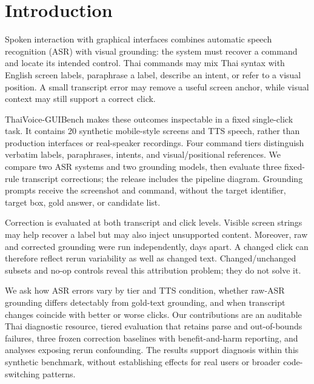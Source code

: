 \section{Introduction}

Spoken interaction with graphical interfaces combines automatic speech recognition (ASR) with visual grounding: the system must recover a command and locate its intended control. Thai commands may mix Thai syntax with English screen labels, paraphrase a label, describe an intent, or refer to a visual position. A small transcript error may remove a useful screen anchor, while visual context may still support a correct click.

ThaiVoice-GUIBench makes these outcomes inspectable in a fixed single-click task. It contains 20 synthetic mobile-style screens and TTS speech, rather than production interfaces or real-speaker recordings. Four command tiers distinguish verbatim labels, paraphrases, intents, and visual/positional references. We compare two ASR systems and two grounding models, then evaluate three fixed-rule transcript corrections; the release includes the pipeline diagram. Grounding prompts receive the screenshot and command, without the target identifier, target box, gold answer, or candidate list.

Correction is evaluated at both transcript and click levels. Visible screen strings may help recover a label but may also inject unsupported content. Moreover, raw and corrected grounding were run independently, days apart. A changed click can therefore reflect rerun variability as well as changed text. Changed/unchanged subsets and no-op controls reveal this attribution problem; they do not solve it.

We ask how ASR errors vary by tier and TTS condition, whether raw-ASR grounding differs detectably from gold-text grounding, and when transcript changes coincide with better or worse clicks. Our contributions are an auditable Thai diagnostic resource, tiered evaluation that retains parse and out-of-bounds failures, three frozen correction baselines with benefit-and-harm reporting, and analyses exposing rerun confounding. The results support diagnosis within this synthetic benchmark, without establishing effects for real users or broader code-switching patterns.
